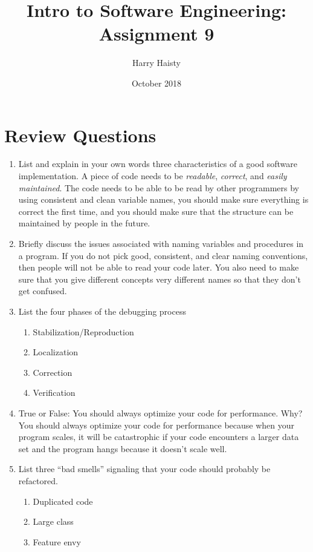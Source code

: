\documentclass[11pt]{article}
\title{Intro to Software Engineering: Assignment 9}
\author{Harry Haisty}
\date{October 2018}
\begin{document}
\maketitle

\section*{Review Questions}
\begin{enumerate} 
\item List and explain in your own words three characteristics of a good software implementation.
\newline \newline
A piece of code needs to be \textit{readable}, \textit{correct}, and \textit{easily maintained}. The code needs to be able to be read by other programmers by using consistent and clean variable names, you should make sure everything is correct the first time, and you should make sure that the structure can be maintained by people in the future.


\item Briefly discuss the issues associated with naming variables and procedures in a program.
\newline \newline
If you do not pick good, consistent, and clear naming conventions, then people will not be able to read your code later. You also need to make sure that you give different concepts very different names so that they don't get confused.

\item List the four phases of the debugging process
\begin{enumerate}
\item Stabilization/Reproduction
\item Localization
\item Correction
\item Verification
\end{enumerate}

\item True or False: You should always optimize your code for performance. Why?
\newline \newline
You should always optimize your code for performance because when your program scales, it will be catastrophic if your code encounters a larger data set and the program hangs because it doesn't scale well. 

\item List three ``bad smells'' signaling that your code should probably be refactored.
\begin{enumerate}
\item Duplicated code
\item Large class
\item Feature envy
\end{enumerate}


\end{enumerate}
\end{document}
